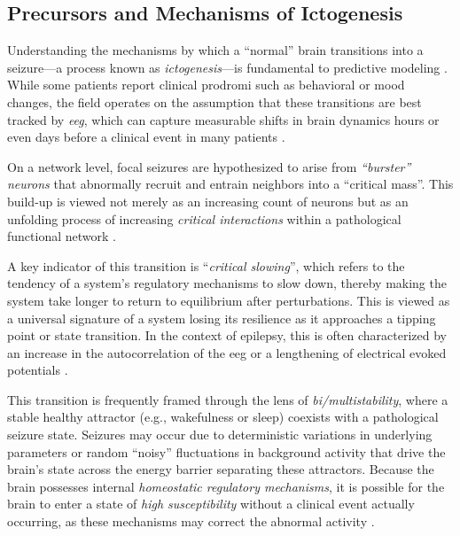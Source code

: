 \subsection{Precursors and Mechanisms of Ictogenesis}
Understanding the mechanisms by which a \enquote{normal} brain transitions into a seizure---a process known as \textit{ictogenesis}---is fundamental to predictive modeling \parencite{mormann_seizure_2007}.
While some patients report clinical prodromi such as behavioral or mood changes, the field operates on the assumption that these transitions are best tracked by \textit{\gls{eeg}}, which can capture measurable shifts in brain dynamics hours or even days before a clinical event in many patients \parencite{freestone_forward-looking_2017, cook_prediction_2013}.

On a network level, focal seizures are hypothesized to arise from \textit{\enquote{burster} neurons} that abnormally recruit and entrain neighbors into a \enquote{critical mass}.
This build-up is viewed not merely as an increasing count of neurons but as an unfolding process of increasing \textit{critical interactions} within a pathological functional network \parencite{mormann_seizure_2007}.

A key indicator of this transition is \enquote{\textit{critical slowing}}, which refers to the tendency of a system's regulatory mechanisms to slow down, thereby making the system take longer to return to equilibrium after perturbations.
This is viewed as a universal signature of a system losing its resilience as it approaches a tipping point or state transition.
In the context of epilepsy, this is often characterized by an increase in the autocorrelation of the \gls{eeg} or a lengthening of electrical evoked potentials \parencite{freestone_forward-looking_2017, maturana_critical_2020}.

This transition is frequently framed through the lens of \textit{bi/multistability}, where a stable healthy attractor (e.g., wakefulness or sleep) coexists with a pathological seizure state.
Seizures may occur due to deterministic variations in underlying parameters or random \enquote{noisy} fluctuations in background activity that drive the brain's state across the energy barrier separating these attractors.
Because the brain possesses internal \textit{homeostatic regulatory mechanisms}, it is possible for the brain to enter a state of \textit{high susceptibility} without a clinical event actually occurring, as these mechanisms may correct the abnormal activity \parencite{freestone_forward-looking_2017}.

